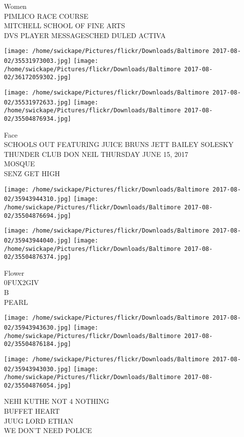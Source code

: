 \documentclass[10pt,letterpaper]{article}
\begin{document}
Women\\
PIMLICO RACE COURSE\\
MITCHELL SCHOOL OF FINE ARTS\\
DVS PLAYER MESSAGESCHED DULED ACTIVA
\pagebreak

\texttt{[image: /home/swickape/Pictures/flickr/Downloads/Baltimore 2017-08-02/35531973003.jpg]}
\texttt{[image: /home/swickape/Pictures/flickr/Downloads/Baltimore 2017-08-02/36172059302.jpg]}

\texttt{[image: /home/swickape/Pictures/flickr/Downloads/Baltimore 2017-08-02/35531972633.jpg]}
\texttt{[image: /home/swickape/Pictures/flickr/Downloads/Baltimore 2017-08-02/35504876934.jpg]}

Face\\
SCHOOLS OUT FEATURING JUICE BRUNS JETT BAILEY SOLESKY THUNDER CLUB DON NEIL THURSDAY JUNE 15, 2017\\
MOSQUE\\
SENZ GET HIGH
\pagebreak

\texttt{[image: /home/swickape/Pictures/flickr/Downloads/Baltimore 2017-08-02/35943944310.jpg]}
\texttt{[image: /home/swickape/Pictures/flickr/Downloads/Baltimore 2017-08-02/35504876694.jpg]}

\texttt{[image: /home/swickape/Pictures/flickr/Downloads/Baltimore 2017-08-02/35943944040.jpg]}
\texttt{[image: /home/swickape/Pictures/flickr/Downloads/Baltimore 2017-08-02/35504876374.jpg]}

Flower\\
0FUX2GIV\\
B\\
PEARL
\pagebreak

\texttt{[image: /home/swickape/Pictures/flickr/Downloads/Baltimore 2017-08-02/35943943630.jpg]}
\texttt{[image: /home/swickape/Pictures/flickr/Downloads/Baltimore 2017-08-02/35504876184.jpg]}

\texttt{[image: /home/swickape/Pictures/flickr/Downloads/Baltimore 2017-08-02/35943943030.jpg]}
\texttt{[image: /home/swickape/Pictures/flickr/Downloads/Baltimore 2017-08-02/35504876054.jpg]}

NEHI KUTHE NOT 4 NOTHING\\
BUFFET HEART\\
JUUG LORD ETHAN\\
WE DON'T NEED POLICE
\pagebreak
\end{document}
